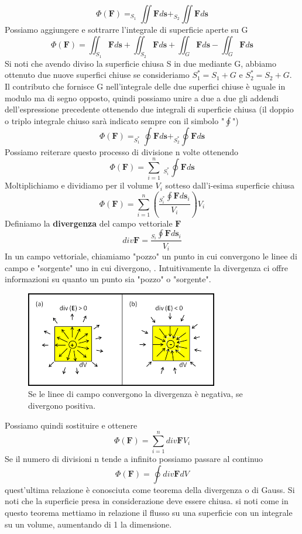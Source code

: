 \documentclass[
10pt, %
a4paper, %
oneside, %
headinclude,footinclude, %
BCOR5mm, %
]{scrartcl}
\begin{document}
\[\Phi(\mathbf{F}) = _{S_1}\iint \mathbf{F}d\mathbf{s}+_{S_2}\iint \mathbf{F}d\mathbf{s}\]
Possiamo aggiungere e sottrarre l'integrale di superficie aperte su G 
\[\Phi(\mathbf{F}) = \iint_{S_1} \mathbf{F}d\mathbf{s}+\iint_{S_2} \mathbf{F}d\mathbf{s}+\iint_{G} \mathbf{F}d\mathbf{s}-\iint_{G} \mathbf{F}d\mathbf{s}\]
Si noti che avendo diviso la superficie chiusa S in due mediante G, abbiamo ottenuto due nuove superfici chiuse se consideriamo \(S_1^* = S_1+G\) e \(S_2^* = S_2+G\). Il contributo che fornisce G nell'integrale delle due superfici chiuse è uguale in modulo ma di segno opposto, quindi possiamo unire a due a due gli addendi dell'espressione precedente ottenendo due integrali di superficie chiusa (il doppio o triplo integrale chiuso sarà indicato sempre con il simbolo "\(\oint\)")
\[\Phi(\mathbf{F}) = _{S_1^*}\oint \mathbf{F}d\mathbf{s}+_{S_2^*}\oint \mathbf{F}d\mathbf{s}\]
Possiamo reiterare questo processo di divisione n volte ottenendo
\[\Phi(\mathbf{F}) = \sum_{i=1}^{n}\ _{S_i^*}\oint \mathbf{F}d\mathbf{s}\]
Moltiplichiamo e dividiamo per il volume \(V_i\) sotteso dall'i-esima superficie chiusa
\[\Phi(\mathbf{F}) = \sum_{i=1}^{n}\left(\frac{_{S_i^*}\oint \mathbf{F}d\mathbf{s}_i}{V_i}\right)V_i\]
Definiamo la \textbf{divergenza} del campo vettoriale $\mathbf{F}$ 
\[div\mathbf{F} = \frac{_{S_i}\oint \mathbf{F}d\mathbf{s}_i}{V_i}\]
In un campo vettoriale, chiamiamo "pozzo" un punto in cui convergono le linee di campo e "sorgente" uno in cui divergono, . Intuitivamente la divergenza ci offre informazioni su quanto un punto sia "pozzo" o "sorgente". 
\begin{figure}[h!]
	\centering
	\includegraphics[width=0.6\linewidth]{images/div}
	\caption{Se le linee di campo convergono la divergenza è negativa, se divergono positiva.}
	\label{fig:div}
\end{figure}
\FloatBarrier
Possiamo quindi sostituire e ottenere
\[\Phi(\mathbf{F}) = \sum_{i=1}^{n}div\mathbf{F}V_i\]
Se il numero di divisioni n tende a infinito possiamo passare al continuo 
\[\Phi(\mathbf{F}) = \oint div\mathbf{F}dV\]
quest'ultima relazione è conosciuta come teorema della divergenza o di Gauss. Si noti che la superficie presa in considerazione deve essere chiusa. si noti come in questo teorema mettiamo in relazione il flusso su una superficie con un integrale su un volume, aumentando di 1 la dimensione.\\
\end{document}
